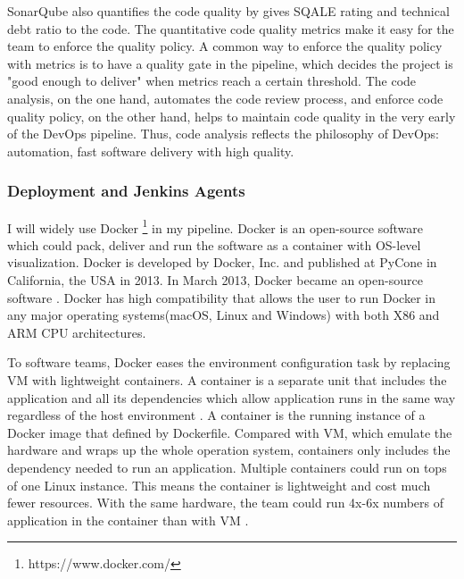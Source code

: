 SonarQube also quantifies the code quality by gives SQALE rating and technical debt ratio to the code. The quantitative code quality metrics make it easy for the team to enforce the quality policy. A common way to enforce the quality policy with metrics is to have a quality gate in the pipeline, which decides the project is "good enough to deliver" when metrics reach a certain threshold.
The code analysis, on the one hand, automates the code review process, and enforce code quality policy, on the other hand, helps to maintain code quality in the very early of the DevOps pipeline. Thus, code analysis reflects the philosophy of DevOps: automation, fast software delivery with high quality.
\subsubsection{Deployment and Jenkins Agents}
I will widely use Docker \footnote{https://www.docker.com/} in my pipeline.
Docker is an open-source software which could pack, deliver and run the software as a container with OS-level visualization. Docker is developed by Docker, Inc. and published at PyCone in California, the USA in 2013. In March 2013, Docker became an open-source software \cite{avram2013docker}. Docker has high compatibility that allows the user to run Docker in any major operating systems(macOS, Linux and Windows) with both X86 and ARM CPU architectures.
\par
To software teams, Docker eases the environment configuration task by replacing VM with lightweight containers.
A container is a separate unit that includes the application and all its dependencies which allow application runs in the same way regardless of the host environment \cite{WhatisaC60:online}. A container is the running instance of a Docker image that defined by Dockerfile. Compared with VM, which emulate the hardware and wraps up the whole operation system, containers only includes the dependency needed to run an application. Multiple containers could run on tops of one Linux instance. This means the container is lightweight and cost much fewer resources. With the same hardware, the team could run 4x-6x numbers of application in the container than with VM \cite{vaughan2014docker}.

